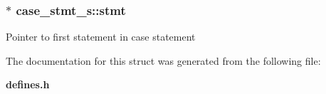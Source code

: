 \subsubsection{$\ast$ {\bf case\_\-stmt\_\-s::stmt}}\label{structcase__stmt__s_o1}


Pointer to first statement in case statement 

The documentation for this struct was generated from the following file:\begin{CompactItemize}
\item 
{\bf defines.h}\end{CompactItemize}
